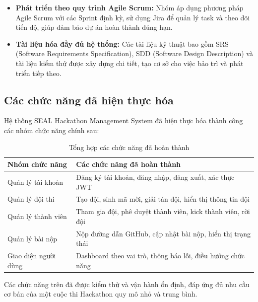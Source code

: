 \begin{itemize}
	\item \textbf{Phát triển theo quy trình Agile Scrum:} Nhóm áp dụng phương pháp Agile Scrum với các Sprint định kỳ, sử dụng Jira để quản lý task và theo dõi tiến độ, giúp đảm bảo dự án hoàn thành đúng hạn.
	
	\item \textbf{Tài liệu hóa đầy đủ hệ thống:} Các tài liệu kỹ thuật bao gồm SRS (Software Requirements Specification), SDD (Software Design Description) và tài liệu kiểm thử được xây dựng chi tiết, tạo cơ sở cho việc bảo trì và phát triển tiếp theo.
\end{itemize}


\subsection{Các chức năng đã hiện thực hóa}

Hệ thống SEAL Hackathon Management System đã hiện thực hóa thành công các nhóm chức năng chính sau:

\begin{table}[H]
	\centering
	\caption{Tổng hợp các chức năng đã hoàn thành}
	\label{tab:completed-features}
	\renewcommand{\arraystretch}{1.3}
	\begin{tabular}{|p{4cm}|p{10cm}|}
		\hline
		\textbf{Nhóm chức năng} & \textbf{Các chức năng đã hoàn thành} \\
		\hline
		Quản lý tài khoản & Đăng ký tài khoản, đăng nhập, đăng xuất, xác thực JWT \\
		\hline
		Quản lý đội thi & Tạo đội, sinh mã mời, giải tán đội, hiển thị thông tin đội \\
		\hline
		Quản lý thành viên & Tham gia đội, phê duyệt thành viên, kick thành viên, rời đội \\
		\hline
		Quản lý bài nộp & Nộp đường dẫn GitHub, cập nhật bài nộp, hiển thị trạng thái \\
		\hline
		Giao diện người dùng & Dashboard theo vai trò, thông báo lỗi, điều hướng chức năng \\
		\hline
	\end{tabular}
\end{table}

Các chức năng trên đã được kiểm thử và vận hành ổn định, đáp ứng đủ nhu cầu cơ bản của một cuộc thi Hackathon quy mô nhỏ và trung bình.


